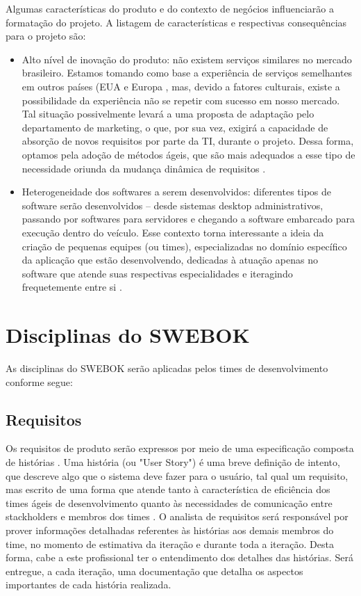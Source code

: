 \documentclass[12pt,journal,compsoc]{IEEEtran}
\begin{document}
Algumas características do produto e do contexto de negócios influenciarão a formatação do projeto. A listagem de características e respectivas consequências para o projeto são:

\begin{itemize}

\item Alto nível de inovação do produto: não existem serviços similares no mercado brasileiro. Estamos tomando como base a experiência de serviços semelhantes em outros países (EUA e Europa \cite{car2go_locations}, mas, devido a fatores culturais, existe a possibilidade da experiência não se repetir com sucesso em nosso mercado. Tal situação possivelmente levará a uma proposta de adaptação pelo departamento de marketing, o que, por sua vez, exigirá a capacidade de absorção de novos requisitos por parte da TI, durante o projeto. Dessa forma, optamos pela adoção de métodos ágeis, que são mais adequados a esse tipo de necessidade oriunda da mudança dinâmica de requisitos \cite{cao_ramesh_2008}.

\item Heterogeneidade dos softwares a serem desenvolvidos: diferentes tipos de software serão desenvolvidos -- desde sistemas desktop administrativos, passando por softwares para servidores e chegando a software embarcado para execução dentro do veículo. Esse contexto torna interessante a ideia da criação de pequenas equipes (ou times), especializadas no domínio específico da aplicação que estão desenvolvendo, dedicadas à atuação apenas no software que atende suas respectivas especialidades e iteragindo frequetemente entre si \cite{backmann_nord_ozkaya_2012}.

\end{itemize}

\section{Disciplinas do SWEBOK}

As disciplinas do SWEBOK serão aplicadas pelos times de desenvolvimento conforme segue: 

\subsection{Requisitos}

Os requisitos de produto serão expressos por meio de uma especificação composta de histórias \cite{primo_user_2011}. Uma história (ou "User Story") é uma breve definição de intento, que descreve algo que o sistema deve fazer para o usuário, tal qual um requisito, mas escrito de uma forma que atende tanto à característica de eficiência dos times ágeis de desenvolvimento quanto às necessidades de comunicação entre stackholders e membros dos times \cite{agile_sw_requirements}. O analista de requisitos será responsável por prover informações detalhadas referentes às histórias aos demais membros do time, no momento de estimativa da iteração e durante toda a iteração. Desta forma, cabe a este profissional ter o entendimento dos detalhes das histórias. Será entregue, a cada iteração, uma documentação que detalha os aspectos importantes de cada história realizada. 
\end{document}
